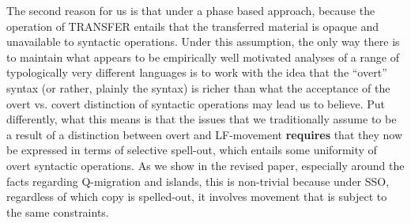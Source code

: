 \documentclass[11pt]{article}
\begin{document}
The second reason for us is that under a phase based approach, because the operation of TRANSFER entails that the transferred material is opaque and unavailable to syntactic operations. Under this assumption, the only way there is to maintain what appears to be empirically well motivated analyses of a range of typologically very different languages is to work with the idea that the ``overt'' syntax (or rather, plainly the syntax) is richer than what the acceptance of the overt vs. covert distinction of syntactic operations may lead us to believe. Put differently, what this means is that the issues that we traditionally assume to be a result of a distinction between overt and LF-movement \textbf{requires} that they now be expressed in terms of selective spell-out, which entails some uniformity of overt syntactic operations. As we show in the revised paper, especially around the facts regarding Q-migration and islands, this is non-trivial because under SSO, regardless of which copy is spelled-out, it involves movement that is subject to the same constraints.



\end{document}
